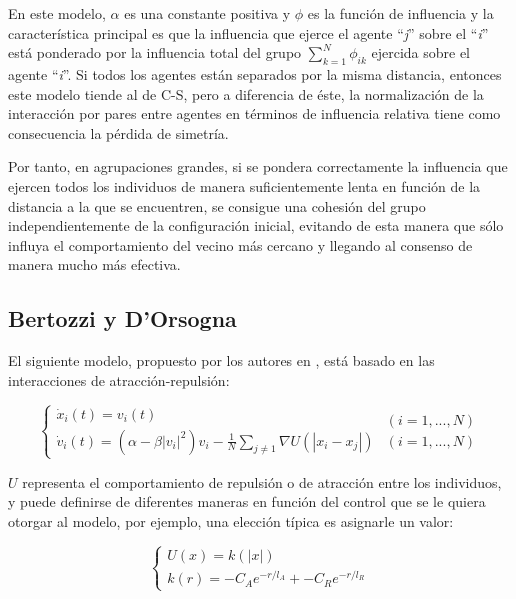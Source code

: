 En este modelo, $\alpha$ es una constante positiva y $\phi$ es la función de influencia y la característica principal es que la influencia que ejerce el agente ``\textit{j}'' sobre el ``\textit{i}'' está ponderado por la influencia total del grupo $\sum_{k=1}^{N}\phi_{ik}$ ejercida sobre el agente ``\textit{i}''. Si todos los agentes están separados por la misma distancia, entonces este modelo tiende al de C-S, pero a diferencia de éste, la normalización de la interacción por pares entre agentes en términos de influencia relativa tiene como consecuencia la pérdida de simetría.

Por tanto, en agrupaciones grandes, si se pondera correctamente la influencia que ejercen todos los individuos de manera suficientemente lenta en función de la distancia a la que se encuentren, se consigue una cohesión del grupo independientemente de la configuración inicial, evitando de esta manera que sólo influya el comportamiento del vecino más cercano y llegando al consenso de manera mucho más efectiva.

 \subsection{Bertozzi y D'Orsogna}
 El siguiente modelo, propuesto por los autores \citeauthor{d2006self} en \cite{d2006self}, está basado en las interacciones de atracción-repulsión:

\begin{equation}\label{eq:attractionRepulsion} 
    \left\lbrace
    \begin{array}{ll}
        \dot{x}_{i}(t)=v_{i}(t) \\
        \dot{v}_{i}(t)=\displaystyle{(\alpha - \beta |v_{i}|^{2})v_{i} -\frac{1}{N}\sum_{j\neq 1}\nabla U(|x_{i}-x_{j}|)}
    \end{array}
    \begin{array}{rr}
        (i = 1, ..., N) \\
        (i = 1, ..., N)
    \end{array}
    \right.
\end{equation}

$U$ representa el comportamiento de repulsión o de atracción entre los individuos, y puede definirse de diferentes maneras en función del control que se le quiera otorgar al modelo, por ejemplo, una elección típica es asignarle un valor: 

\begin{equation}\label{eq:potencialU}
    \left\lbrace
    \begin{array}{l}
        U(x) = k(|x|) \\
        k(r) = -C_{A}e^{-r/l_{A}}+-C_{R}e^{-r/l_{R}}
    \end{array}
    \right.
\end{equation}

